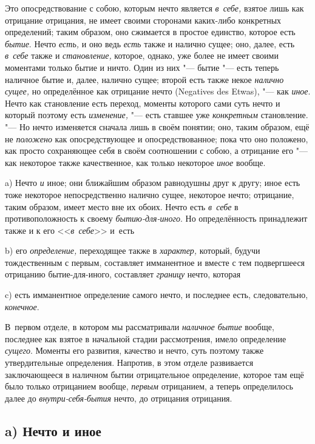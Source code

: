 Это опосредствование с собою, которым нечто является {\em в~себе,} взятое лишь
как отрицание отрицания, не имеет своими сторонами каких-либо конкретных
определений; таким образом, оно сжимается в простое единство, которое есть
{\em бытие}. Нечто {\em есть,} и оно ведь {\em есть} также и налично сущее;
оно, далее, есть {\em в~себе} также и {\em становление,} которое, однако, уже
более не имеет своими моментами только бытие и ничто. Один из них "--- бытие
"--- есть теперь наличное бытие и, далее, налично сущее; второй есть также
некое {\em налично сущее,} но определённое как отрицание нечто (Nega\-tives des
Etwas), "--- как {\em иное}. Нечто как становление есть переход, моменты
которого сами суть нечто и который поэтому есть {\em изменение,} "--- есть
ставшее уже {\em конкретным} становление. "--- Но нечто изменяется сначала лишь
в своём понятии; оно, таким образом, ещё не {\em положено} как опосредствующее
и опосредствованное; пока что оно положено, как просто сохраняющее себя в своём
соотношении с собою, а отрицание его "--- как некоторое также качественное, как
только некоторое {\em иное} вообще.


a) Нечто {\em и} иное; они ближайшим образом равнодушны друг к другу; иное есть
тоже некоторое непосредственно налично сущее, некоторое нечто; отрицание, таким
образом, имеет место вне их обоих. Нечто есть {\em в~себе} в противоположность
к своему {\em бытию-для-иного}. Но определённость принадлежит также и к его
<<{\em в~себе}>> и~есть

b) его {\em определение,} переходящее также в {\em характер,} который, будучи
тождественным с первым, составляет имманентное и вместе с тем подвергшееся
отрицанию бытие-для-иного, составляет {\em границу} нечто, которая

c) есть имманентное определение самого нечто, и последнее есть,
следовательно, {\em конечное}.

В~первом отделе, в котором мы рассматривали {\em наличное бытие} вообще,
последнее как взятое в начальной стадии рассмотрения, имело определение
{\em сущего}. Моменты его развития, качество и нечто, суть поэтому также
утвердительные определения. Напротив, в этом отделе развивается заключающееся
в наличном бытии отрицательное определение, которое там ещё было только
отрицанием вообще, {\em первым} отрицанием, а теперь определилось далее до
{\em внутри-себя-бытия} нечто, до отрицания отрицания.

\subsection[a) Нечто и иное]{a) Нечто и иное}

